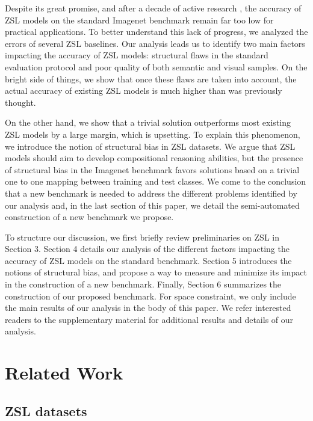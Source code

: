 Despite its great promise, and after a decade of active research \cite{larochelle2008zero}, 
the accuracy of ZSL models on the standard Imagenet benchmark \cite{frome2013devise} remain far too low for practical applications.
To better understand this lack of progress, we analyzed the errors of several ZSL baselines.
Our analysis leads us to identify two main factors impacting the accuracy of ZSL models:
structural flaws in the standard evaluation protocol and poor quality of both semantic and visual samples.
On the bright side of things, we show that once these flaws are taken into account, 
the actual accuracy of existing ZSL models is much higher than was previously thought.

On the other hand, we show that a trivial solution outperforms most existing ZSL models by a large margin, which is upsetting.
To explain this phenomenon, we introduce the notion of structural bias in ZSL datasets.
We argue that ZSL models should aim to develop compositional reasoning abilities, 
but the presence of structural bias in the Imagenet benchmark favors solutions based on a trivial one to one mapping between training and test classes.
We come to the conclusion that a new benchmark is needed to address the different problems identified by our analysis and, %
in the last section of this paper, we detail the semi-automated construction of a new benchmark we propose. %

To structure our discussion, we first briefly review preliminaries on ZSL in Section 3.
Section 4 details our analysis of the different factors impacting the accuracy of ZSL models on the standard benchmark.
Section 5 introduces the notions of structural bias, 
and propose a way to measure and minimize its impact in the construction of a new benchmark.
Finally, Section 6 summarizes the construction of our proposed benchmark.
For space constraint, we only include the main results of our analysis in the body of this paper. 
We refer interested readers to the supplementary material for additional results and details of our analysis.

\section{Related Work}
\subsection{ZSL datasets}

